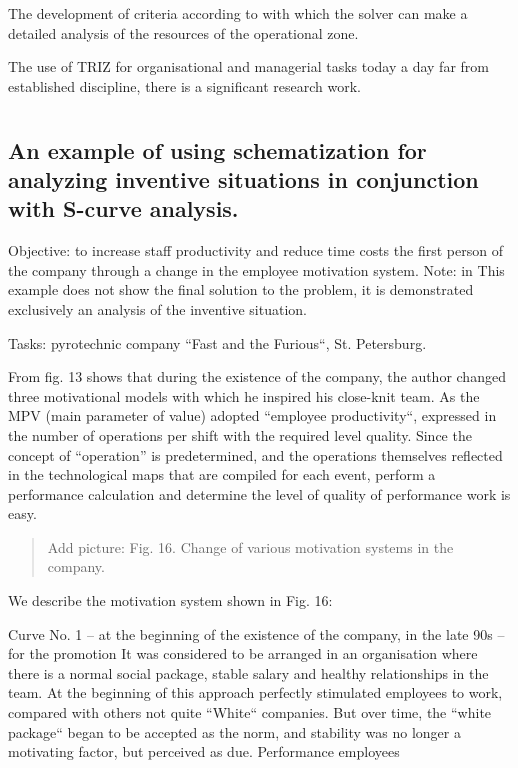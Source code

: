 \documentclass[11pt,a4paper]{book}
\newcommand{\addpicture}[1]{
  \begin{quote} Add picture: #1\end{quote}
}
\begin{document}
The development of criteria according to with which the solver can make a
detailed analysis of the resources of the operational zone.

The use of TRIZ for organisational and managerial tasks today a day far from
established discipline, there is a significant research work.

\appendix
\chapter{}%

\section{An example of using schematization for analyzing inventive
  situations in conjunction with S-curve analysis.}

Objective: to increase staff productivity and reduce time costs the first
person of the company through a change in the employee motivation system.
Note: in This example does not show the final solution to the problem, it is
demonstrated exclusively an analysis of the inventive situation.

Tasks: pyrotechnic company “Fast and the Furious“, St. Petersburg.

From fig. 13 shows that during the existence of the company, the author
changed three motivational models with which he inspired his close-knit team.
As the MPV (main parameter of value) adopted “employee productivity“,
expressed in the number of operations per shift with the required level
quality. Since the concept of “operation” is predetermined, and the
operations themselves reflected in the technological maps that are compiled
for each event, perform a performance calculation and determine the level of
quality of performance work is easy.

\addpicture{Fig. 16. Change of various motivation systems in the company.}

We describe the motivation system shown in Fig. 16:

Curve No. 1 -- at the beginning of the existence of the company, in the late
90s -- for the promotion It was considered to be arranged in an organisation
where there is a normal social package, stable salary and healthy
relationships in the team. At the beginning of this approach perfectly
stimulated employees to work, compared with others not quite “White“
companies. But over time, the “white package“ began to be accepted as the
norm, and stability was no longer a motivating factor, but perceived as due.
Performance employees
\end{document}
